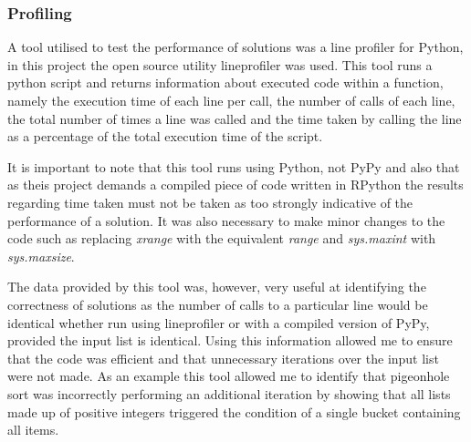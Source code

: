 \documentclass[12pt]{article}
\begin{document}
\subsubsection{Profiling}
A tool utilised to test the performance of solutions was a line profiler for Python, in this project the open source utility line\textunderscore profiler \cite{lineprof} was used. This tool runs a python script and returns information about executed code within a function, namely the execution time of each line per call, the number of calls of each line, the total number of times a line was called and the time taken by calling the line as a percentage of the total execution time of the script.
\par 
It is important to note that this tool runs using Python, not PyPy and also that as theis project demands a compiled piece of code written in RPython the results regarding time taken must not be taken as too strongly indicative of the performance of a solution. It was also necessary to make minor changes to the code such as replacing \textit{xrange} with the equivalent \textit{range} and \textit{sys.maxint} with \textit{sys.maxsize}.
\par 
The data provided by this tool was, however, very useful at identifying the correctness of solutions as the number of calls to a particular line would be identical whether run using line\textunderscore profiler or with a compiled version of PyPy, provided the input list is identical. Using this information allowed me to ensure that the code was efficient and that unnecessary iterations over the input list were not made. As an example this tool allowed me to identify that pigeonhole sort was incorrectly performing an additional iteration by showing that all lists made up of positive integers triggered the condition of a single bucket containing all items.
\par
\end{document}
